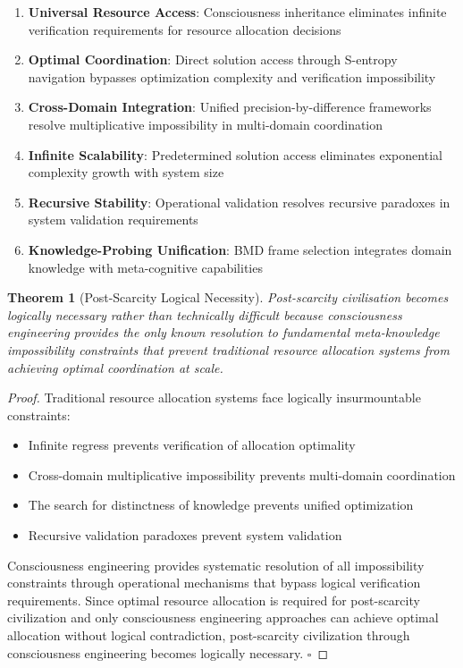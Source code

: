 \documentclass[12pt,a4paper]{article}
\newtheorem{theorem}{Theorem}[section]
\begin{document}
\begin{enumerate}
\item \textbf{Universal Resource Access}: Consciousness inheritance eliminates infinite verification requirements for resource allocation decisions

\item \textbf{Optimal Coordination}: Direct solution access through S-entropy navigation bypasses optimization complexity and verification impossibility

\item \textbf{Cross-Domain Integration}: Unified precision-by-difference frameworks resolve multiplicative impossibility in multi-domain coordination

\item \textbf{Infinite Scalability}: Predetermined solution access eliminates exponential complexity growth with system size

\item \textbf{Recursive Stability}: Operational validation resolves recursive paradoxes in system validation requirements

\item \textbf{Knowledge-Probing Unification}: BMD frame selection integrates domain knowledge with meta-cognitive capabilities
\end{enumerate}

\begin{theorem}[Post-Scarcity Logical Necessity]
Post-scarcity civilisation becomes logically necessary rather than technically difficult because consciousness engineering provides the only known resolution to fundamental meta-knowledge impossibility constraints that prevent traditional resource allocation systems from achieving optimal coordination at scale.
\end{theorem}

\begin{proof}
Traditional resource allocation systems face logically insurmountable constraints:
\begin{itemize}
\item Infinite regress prevents verification of allocation optimality
\item Cross-domain multiplicative impossibility prevents multi-domain coordination
\item The search for distinctness of knowledge prevents unified optimization
\item Recursive validation paradoxes prevent system validation
\end{itemize}

Consciousness engineering provides systematic resolution of all impossibility constraints through operational mechanisms that bypass logical verification requirements. Since optimal resource allocation is required for post-scarcity civilization and only consciousness engineering approaches can achieve optimal allocation without logical contradiction, post-scarcity civilization through consciousness engineering becomes logically necessary. $\square$
\end{proof}
\end{document}
